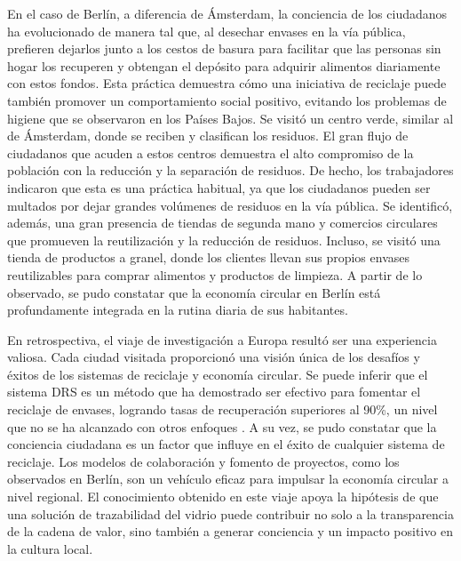 En el caso de Berlín, a diferencia de Ámsterdam, la conciencia de los ciudadanos ha evolucionado de manera tal que, al desechar envases en la vía pública, prefieren dejarlos junto a los cestos de basura para facilitar que las personas sin hogar los recuperen y obtengan el depósito para adquirir alimentos diariamente con estos fondos. Esta práctica demuestra cómo una iniciativa de reciclaje puede también promover un comportamiento social positivo, evitando los problemas de higiene que se observaron en los Países Bajos. Se visitó un centro verde, similar al de Ámsterdam, donde se reciben y clasifican los residuos. El gran flujo de ciudadanos que acuden a estos centros demuestra el alto compromiso de la población con la reducción y la separación de residuos. De hecho, los trabajadores indicaron que esta es una práctica habitual, ya que los ciudadanos pueden ser multados por dejar grandes volúmenes de residuos en la vía pública. Se identificó, además, una gran presencia de tiendas de segunda mano y comercios circulares que promueven la reutilización y la reducción de residuos. Incluso, se visitó una tienda de productos a granel, donde los clientes llevan sus propios envases reutilizables para comprar alimentos y productos de limpieza. A partir de lo observado, se pudo constatar que la economía circular en Berlín está profundamente integrada en la rutina diaria de sus habitantes.

En retrospectiva, el viaje de investigación a Europa resultó ser una experiencia valiosa. Cada ciudad visitada proporcionó una visión única de los desafíos y éxitos de los sistemas de reciclaje y economía circular. Se puede inferir que el sistema DRS es un método que ha demostrado ser efectivo para fomentar el reciclaje de envases, logrando tasas de recuperación superiores al 90\%, un nivel que no se ha alcanzado con otros enfoques \cite{pending}. A su vez, se pudo constatar que la conciencia ciudadana es un factor que influye en el éxito de cualquier sistema de reciclaje. Los modelos de colaboración y fomento de proyectos, como los observados en Berlín, son un vehículo eficaz para impulsar la economía circular a nivel regional. El conocimiento obtenido en este viaje apoya la hipótesis de que una solución de trazabilidad del vidrio puede contribuir no solo a la transparencia de la cadena de valor, sino también a generar conciencia y un impacto positivo en la cultura local.

